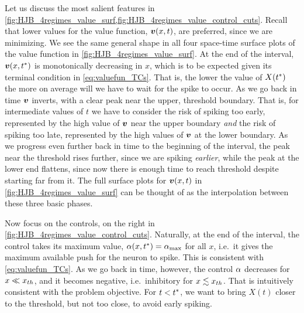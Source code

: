 \documentclass[12pt]{iopart}
\begin{document}
Let us discuss the most salient features in
\cref{fig:HJB_4regimes_value_surf,fig:HJB_4regimes_value_control_cuts}. Recall
that lower values for the value function, ${ \boldsymbol{v} }(x,t)$, are preferred, since we are
minimizing. We see the same general shape in all four space-time surface plots
of the value function in \cref{fig:HJB_4regimes_value_surf}. At the end of the
interval, ${ \boldsymbol{v} }(x,{ t^* })$ is monotonically decreasing in $x$, which is to be expected
given its terminal condition in \cref{eq:valuefun_TCs}. That is, the lower the
value of $X({ t^* })$ the more on average will we have to wait for the spike to
occur.
As we go back in time ${ \boldsymbol{v} }$ inverts, with a clear peak near the upper, threshold
boundary. That is, for intermediate values of $t$ we have to consider the risk
of spiking too early, represented by the high value of ${ \boldsymbol{v} }$ near the upper
boundary {\sl and} the risk of spiking too late, represented by the high values
of ${ \boldsymbol{v} }$ at the lower boundary. As we progress even further back in time to the
beginning of the interval, the peak near the threshold rises further, since we are spiking
{\sl earlier}, while the peak at the lower end flattens, since now there is
enough time to reach threshold despite starting far from it. The full surface
plots for ${ \boldsymbol{v} }(x,t)$ in \cref{fig:HJB_4regimes_value_surf} can be thought of as
the interpolation between these three basic phases.

Now focus on the controls, on the right in
\cref{fig:HJB_4regimes_value_control_cuts}. Naturally, at the end of the
interval, the control takes its maximum value, ${\alpha}(x,{ t^* }) = { {\alpha}_{\textrm{max}} }$ for all $x$,
i.e.\ it gives the maximum available push for the neuron to spike. This is
consistent with \cref{eq:valuefun_TCs}. As we go back in time,
however, the control ${\alpha}$ decreases for $x \ll { x_{th} }$, and it becomes negative, i.e.\ inhibitory for $x
\lesssim { x_{th} }$. That is intuitively consistent with the problem objective. 
For $t<{ t^* }$, we want to bring $X(t)$ closer to the threshold, but not too close, to
avoid early spiking. 
\end{document}
